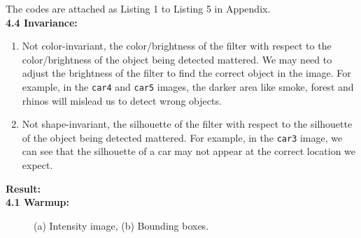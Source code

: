 \documentclass{assignment}
\begin{document}
\begin{problemlist}
The codes are attached as Listing 1 to Listing 5 in Appendix.\\

\textbf{4.4 Invariance:}
\begin{enumerate}[label={\alph*)}]
        \item Not color-invariant, the color/brightness of the filter with respect to the color/brightness of the object being detected mattered. We may need to adjust the brightness of the filter to find the correct object in the image. For example, in the \texttt{car4} and \texttt{car5} images, the darker area like smoke, forest and rhinos will mislead us to detect wrong objects.
        \item Not shape-invariant, the silhouette of the filter with respect to the silhouette of the object being detected mattered. For example, in the \texttt{car3} image, we can see that the silhouette of a car may not appear at the correct location we expect.
    \end{enumerate}

\textbf{Result:}\\

\textbf{4.1 Warmup:}
\begin{figure}[H]
    \begin{center}
        \hspace{0.5cm}
        \caption{(a) Intensity image, (b) Bounding boxes.}
        \label{fig:4_1images}
    \end{center}
\end{figure}


\end{problemlist}
\end{document}
